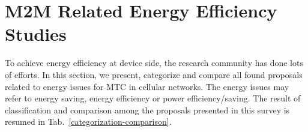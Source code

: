 \section{M2M Related Energy Efficiency Studies}
\label{sec:overview-proposals}
To achieve energy efficiency at device side, the research community has done lots of efforts. In this section, we present, categorize and compare all found proposals related to energy issues for MTC in cellular networks. The energy issues may refer to energy saving, energy efficiency or power efficiency/saving. The result of classification and comparison among the proposals presented in this survey is resumed in Tab.~\ref{categorization-comparison}. 
\begin{table}[]
	\centering
	\caption{Categorization and comparison of energy/power saving-related proposals}
	\label{categorization-comparison}
\end{table}
